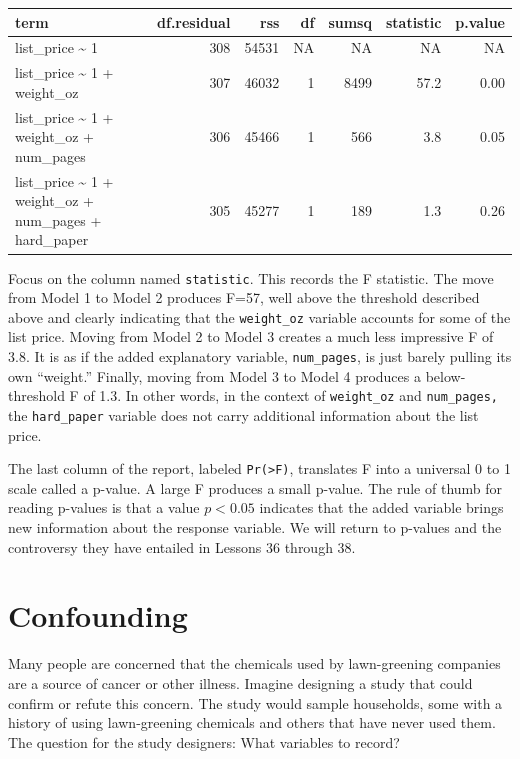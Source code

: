 \documentclass[
  letterpaper,
  DIV=11,
  numbers=noendperiod,
  oneside]{scrreprt}
\begin{document}
\ttfamily 
\begin{tabular}{lrrrrrr}
\toprule
term & df.residual & rss & df & sumsq & statistic & p.value\\
\midrule
list\_price \textasciitilde{} 1 & 308 & 54531 & NA & NA & NA & NA\\
list\_price \textasciitilde{} 1 + weight\_oz & 307 & 46032 & 1 & 8499 & 57.2 & 0.00\\
list\_price \textasciitilde{} 1 + weight\_oz + num\_pages & 306 & 45466 & 1 & 566 & 3.8 & 0.05\\
list\_price \textasciitilde{} 1 + weight\_oz + num\_pages + hard\_paper & 305 & 45277 & 1 & 189 & 1.3 & 0.26\\
\bottomrule
\end{tabular} \normalfont
\bigskip

Focus on the column named \texttt{statistic}. This records the F
statistic. The move from Model 1 to Model 2 produces F=57, well above
the threshold described above and clearly indicating that the
\texttt{weight\_oz} variable accounts for some of the list price. Moving
from Model 2 to Model 3 creates a much less impressive F of 3.8. It is
as if the added explanatory variable, \texttt{num\_pages}, is just
barely pulling its own ``weight.'' Finally, moving from Model 3 to Model
4 produces a below-threshold F of 1.3. In other words, in the context of
\texttt{weight\_oz} and \texttt{num\_pages,} the \texttt{hard\_paper}
variable does not carry additional information about the list price.

The last column of the report, labeled \texttt{Pr(\textgreater{}F)},
translates F into a universal 0 to 1 scale called a p-value. A large F
produces a small p-value. The rule of thumb for reading p-values is that
a value \(p < 0.05\) indicates that the added variable brings new
information about the response variable. We will return to p-values and
the controversy they have entailed in Lessons 36 through 38.

\hypertarget{sec-lesson-30}{%
\chapter{Confounding}\label{sec-lesson-30}}

Many people are concerned that the chemicals used by lawn-greening
companies are a source of cancer or other illness. Imagine designing a
study that could confirm or refute this concern. The study would sample
households, some with a history of using lawn-greening chemicals and
others that have never used them. The question for the study designers:
What variables to record?
\end{document}
